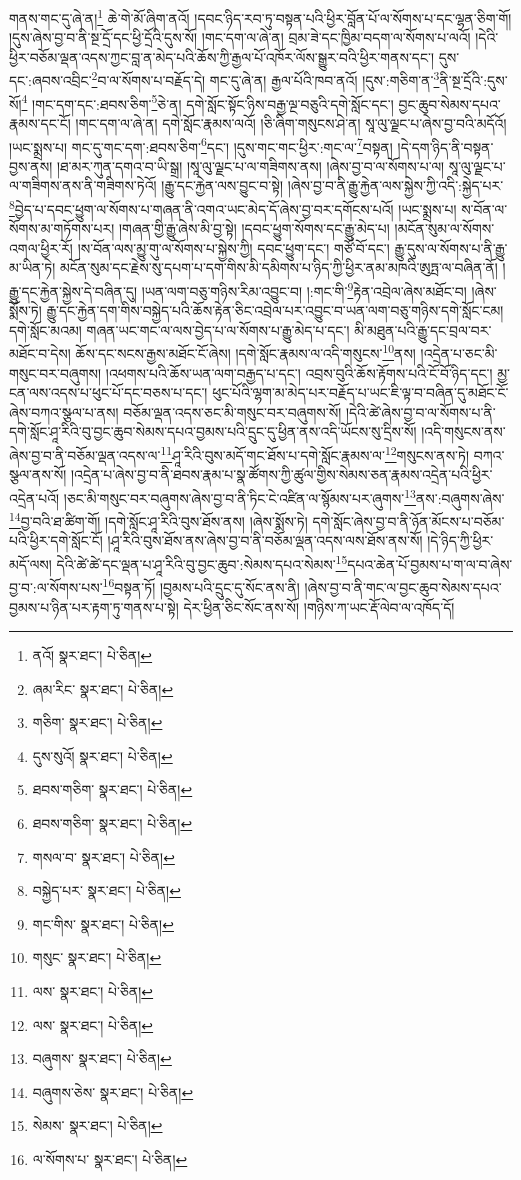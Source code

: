 གནས་གང་དུ་ཞེ་ན།\footnote{ནའོ།  སྣར་ཐང་།  པེ་ཅིན། } ཆེ་གེ་མོ་ཞིག་ནའོ། །དབང་ཉིད་རབ་ཏུ་བསྟན་པའི་ཕྱིར་བློན་པོ་ལ་སོགས་པ་དང་ལྷན་ཅིག་གོ། །དུས་ཞེས་བྱ་བ་ནི་སྔ་དྲོ་དང་ཕྱི་དྲོའི་དུས་སོ། །གང་དག་ལ་ཞེ་ན། བྲམ་ཟེ་དང་ཁྱིམ་བདག་ལ་སོགས་པ་ལའོ། །དེའི་ཕྱིར་བཅོམ་ལྡན་འདས་ཀྱང་བླ་ན་མེད་པའི་ཆོས་ཀྱི་རྒྱལ་པོ་འཁོར་ལོས་སྒྱུར་བའི་ཕྱིར་གནས་དང་། དུས་དང་:ཞབས་འབྲིང་\footnote{ཞམ་རིང་  སྣར་ཐང་།  པེ་ཅིན། }བ་ལ་སོགས་པ་བརྗོད་དེ། གང་དུ་ཞེ་ན། རྒྱལ་པོའི་ཁབ་ནའོ། །དུས་:གཅིག་ན་\footnote{གཅིག་  སྣར་ཐང་།  པེ་ཅིན། }ནི་སྔ་དྲོའི་:དུས་སོ།\footnote{དུས་སུའོ།  སྣར་ཐང་།  པེ་ཅིན། } །གང་དག་དང་:ཐབས་ཅིག་\footnote{ཐབས་གཅིག་  སྣར་ཐང་།  པེ་ཅིན། }ཅེ་ན། དགེ་སློང་སྟོང་ཉིས་བརྒྱ་ལྔ་བཅུའི་དགེ་སློང་དང་། བྱང་ཆུབ་སེམས་དཔའ་རྣམས་དང་ངོ། །གང་དག་ལ་ཞེ་ན། དགེ་སློང་རྣམས་ལའོ། །ཅི་ཞིག་གསུངས་ཤེ་ན། སཱ་ལུ་ལྗང་པ་ཞེས་བྱ་བའི་མདོའོ། །ཡང་སྨྲས་པ། གང་དུ་གང་དག་:ཐབས་ཅིག་\footnote{ཐབས་གཅིག་  སྣར་ཐང་།  པེ་ཅིན། }དང་། །དུས་གང་གང་ཕྱིར་:གང་ལ་\footnote{གསལ་བ་  སྣར་ཐང་།  པེ་ཅིན། }བསྟན། །དེ་དག་ཉིད་ནི་བསྟན་བྱས་ནས། །ཐ་མར་ཀུན་དགའ་བ་ཡི་སྒྲ། །སཱ་ལུ་ལྗང་པ་ལ་གཟིགས་ནས། །ཞེས་བྱ་བ་ལ་སོགས་པ་ལ། སཱ་ལུ་ལྗང་པ་ལ་གཟིགས་ནས་ནི་གཟིགས་ཏེའོ། །རྒྱུ་དང་རྐྱེན་ལས་བྱུང་བ་སྟེ། །ཞེས་བྱ་བ་ནི་རྒྱུ་རྐྱེན་ལས་སྐྱེས་ཀྱི་འདི་:སྐྱེད་པར་\footnote{བསྐྱེད་པར་  སྣར་ཐང་།  པེ་ཅིན། }བྱེད་པ་དབང་ཕྱུག་ལ་སོགས་པ་གཞན་ནི་འགའ་ཡང་མེད་དོ་ཞེས་བྱ་བར་དགོངས་པའོ། །ཡང་སྨྲས་པ། ས་བོན་ལ་སོགས་མ་གཏོགས་པར། །གཞན་གྱི་རྒྱུ་ཞེས་མི་བྱ་སྟེ། །དབང་ཕྱུག་སོགས་དང་རྒྱུ་མེད་པ། །མངོན་སུམ་ལ་སོགས་འགལ་ཕྱིར་རོ། །ས་བོན་ལས་མྱུ་གུ་ལ་སོགས་པ་སྐྱེས་ཀྱི། དབང་ཕྱུག་དང་། གཙོ་བོ་དང་། རྒྱུ་དུས་ལ་སོགས་པ་ནི་རྒྱུ་མ་ཡིན་ཏེ། མངོན་སུམ་དང་རྗེས་སུ་དཔག་པ་དག་གིས་མི་དམིགས་པ་ཉིད་ཀྱི་ཕྱིར་ནམ་མཁའི་ཨུཏྤ་ལ་བཞིན་ནོ། །རྒྱུ་དང་རྐྱེན་སྐྱེས་དེ་བཞིན་དུ། །ཡན་ལག་བཅུ་གཉིས་རིམ་འབྱུང་བ། །:གང་གི་\footnote{གང་གིས་  སྣར་ཐང་།  པེ་ཅིན། }རྟེན་འབྲེལ་ཞེས་མཐོང་བ། །ཞེས་སྨོས་ཏེ། རྒྱུ་དང་རྐྱེན་དག་གིས་བསྐྱེད་པའི་ཆོས་རྟེན་ཅིང་འབྲེལ་པར་འབྱུང་བ་ཡན་ལག་བཅུ་གཉིས་དགེ་སློང་ངམ། དགེ་སློང་མའམ། གཞན་ཡང་གང་ལ་ལས་བྱེད་པ་ལ་སོགས་པ་རྒྱུ་མེད་པ་དང་། མི་མཐུན་པའི་རྒྱུ་དང་བྲལ་བར་མཐོང་བ་དེས། ཆོས་དང་སངས་རྒྱས་མཐོང་ངོ་ཞེས། །དགེ་སློང་རྣམས་ལ་འདི་གསུངས་\footnote{གསུང་  སྣར་ཐང་།  པེ་ཅིན། }ནས། །འདྲེན་པ་ཅང་མི་གསུང་བར་བཞུགས། །འཕགས་པའི་ཆོས་ཡན་ལག་བརྒྱད་པ་དང་། འབྲས་བུའི་ཆོས་རྟོགས་པའི་ངོ་བོ་ཉིད་དང་། མྱ་ངན་ལས་འདས་པ་ཕུང་པོ་དང་བཅས་པ་དང་། ཕུང་པོའི་ལྷག་མ་མེད་པར་བརྗོད་པ་ཡང་ཇི་ལྟ་བ་བཞིན་དུ་མཐོང་ངོ་ཞེས་བཀའ་སྩལ་པ་ནས། བཅོམ་ལྡན་འདས་ཅང་མི་གསུང་བར་བཞུགས་སོ། །དེའི་ཚེ་ཞེས་བྱ་བ་ལ་སོགས་པ་ནི་དགེ་སློང་ཤཱ་རིའི་བུ་བྱང་ཆུབ་སེམས་དཔའ་བྱམས་པའི་དྲུང་དུ་ཕྱིན་ནས་འདི་ཡོངས་སུ་དྲིས་སོ། །འདི་གསུངས་ནས་ཞེས་བྱ་བ་ནི་བཅོམ་ལྡན་འདས་ལ་\footnote{ལས་  སྣར་ཐང་།  པེ་ཅིན། }ཤཱ་རིའི་བུས་མདོ་གང་ཐོས་པ་དགེ་སློང་རྣམས་ལ་\footnote{ལས་  སྣར་ཐང་།  པེ་ཅིན། }གསུངས་ནས་ཏེ། བཀའ་སྩལ་ནས་སོ། །འདྲེན་པ་ཞེས་བྱ་བ་ནི་ཐབས་རྣམ་པ་སྣ་ཚོགས་ཀྱི་ཚུལ་གྱིས་སེམས་ཅན་རྣམས་འདྲེན་པའི་ཕྱིར་འདྲེན་པའོ། །ཅང་མི་གསུང་བར་བཞུགས་ཞེས་བྱ་བ་ནི་ཏིང་ངེ་འཛིན་ལ་སྙོམས་པར་ཞུགས་\footnote{བཞུགས་  སྣར་ཐང་།  པེ་ཅིན། }ནས་:བཞུགས་ཞེས་\footnote{བཞུགས་ཅེས་  སྣར་ཐང་།  པེ་ཅིན། }བྱ་བའི་ཐ་ཚིག་གོ། །དགེ་སློང་ཤཱ་རིའི་བུས་ཐོས་ནས། །ཞེས་སྨོས་ཏེ། དགེ་སློང་ཞེས་བྱ་བ་ནི་ཉོན་མོངས་པ་བཅོམ་པའི་ཕྱིར་དགེ་སློང་ངོ། །ཤཱ་རིའི་བུས་ཐོས་ནས་ཞེས་བྱ་བ་ནི་བཅོམ་ལྡན་འདས་ལས་ཐོས་ནས་སོ། །དེ་ཉིད་ཀྱི་ཕྱིར་མདོ་ལས། དེའི་ཚེ་ཚེ་དང་ལྡན་པ་ཤཱ་རིའི་བུ་བྱང་ཆུབ་:སེམས་དཔའ་སེམས་\footnote{སེམས་  སྣར་ཐང་།  པེ་ཅིན། }དཔའ་ཆེན་པོ་བྱམས་པ་ག་ལ་བ་ཞེས་བྱ་བ་:ལ་སོགས་པས་\footnote{ལ་སོགས་པ་  སྣར་ཐང་།  པེ་ཅིན། }བསྟན་ཏོ། །བྱམས་པའི་དྲུང་དུ་སོང་ནས་ནི། །ཞེས་བྱ་བ་ནི་གང་ལ་བྱང་ཆུབ་སེམས་དཔའ་བྱམས་པ་ཉིན་པར་རྟག་ཏུ་གནས་པ་སྟེ། དེར་ཕྱིན་ཅིང་སོང་ནས་སོ། །གཉིས་ཀ་ཡང་རྡོ་ལེབ་ལ་འཁོད་དོ། 